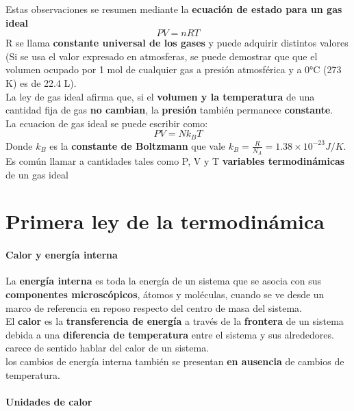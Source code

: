 \documentclass[10pt]{article}
\begin{document}
Estas observaciones se resumen mediante la \textbf{ecuación de estado para un gas ideal}
\begin{equation*}
	PV = nRT
\end{equation*}
R se llama \textbf{constante universal de los gases} y puede adquirir distintos valores (Si se usa el valor expresado en atmosferas, se puede demostrar que que el volumen ocupado por 1 mol de cualquier gas a presión atmosférica y a 0°C (273 K) es de 22.4 L).\\
\linebreak
La ley de gas ideal afirma que, si el \textbf{volumen y la temperatura} de una cantidad fija de gas \textbf{no cambian}, la \textbf{presión} también permanece \textbf{constante}.\\
\linebreak
La ecuacion de gas ideal se puede escribir como:
\begin{equation*}
	PV = Nk_B T
\end{equation*}
Donde $k_B$ es la \textbf{constante de Boltzmann} que vale $k_B = \frac{R}{N_A} = 1.38 \times 10^{-23} J/K$.\\
\linebreak
Es común llamar a cantidades tales como P, V y T \textbf{variables termodinámicas} de un gas ideal

\section{Primera ley de la termodinámica}

\paragraph{Calor y energía interna}

La \textbf{energía interna} es toda la energía de un sistema que se asocia con sus \textbf{componentes microscópicos}, átomos y moléculas, cuando se ve desde un marco de referencia en reposo respecto del centro de masa del sistema.\\
El \textbf{calor} es la \textbf{transferencia de energía} a través de la \textbf{frontera} de un sistema debida a una \textbf{diferencia de temperatura} entre el sistema y sus alrededores. carece de sentido hablar del calor de un sistema.\\
los cambios de energía interna también se presentan \textbf{en ausencia} de cambios de temperatura.

\paragraph{Unidades de calor}
\end{document}
